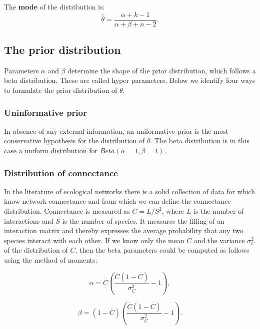 \documentclass[12pt]{article}
\begin{document}
        The \textbf{mode} of the distribution is:
          \begin{equation}
            \hat{\theta} = \frac{\alpha + k - 1}{\alpha + \beta + n - 2} .
            \label{mode}
          \end{equation}

    \subsection*{The prior distribution}    

      Parameters $\alpha$ and $\beta$ determine the shape of the prior distribution, which follows a beta distribution. These are called hyper parameters. Below we identify four ways to formulate the prior distribution of $\theta$. 


      \subsubsection*{Uninformative prior}
        
          In absence of any external information, an uniformative prior is the most conservative hypothesis for the distribution of $\theta$. The beta distribution is in this case a uniform distribution  for $Beta(\alpha=1,\beta=1)$. 

      \subsubsection*{Distribution of connectance}
        
          In the literature of ecological networks there is a solid collection of data for which know network connectance and from which we can define the connectance distribution. Connectance is measured as $C = L/S^2$, where $L$ is the number of interactions and $S$ is the number of species. It measures the filling of an interaction matrix and thereby expresses the average probability that any two species interact with each other. If we know only the mean $\overline{C}$ and the variance $\sigma_C^2$ of the distribution of $C$, then the beta parameters could be computed as follows using the method of moments:

          \begin{equation}
          \alpha = \overline{C}(\frac{\overline{C}(1-\overline{C})}{\sigma_C^2}-1) ,
          \end{equation}

          \begin{equation}
          \beta = (1-\overline{C})(\frac{\overline{C}(1-\overline{C})}{\sigma_C^2}-1) .
          \end{equation}
    
\end{document}
